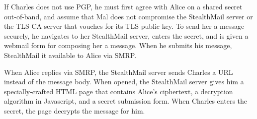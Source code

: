 If Charles does not use PGP, he must first agree with Alice on a shared secret out-of-band, and assume that Mal does not compromise the StealthMail server or the TLS CA server that vouches for its TLS public key.  To send her a message securely, he navigates to her StealthMail server, enters the secret, and is given a webmail form for composing her a message.  When he submits his message, StealthMail it available to Alice via SMRP.

When Alice replies via SMRP, the StealthMail server sends Charles a URL instead of the message body.  When opened, the StealthMail server gives him a specially-crafted HTML page that contains Alice’s ciphertext, a decryption algorithm in Javascript, and a secret submission form.  When Charles enters the secret, the page decrypts the message for him.
